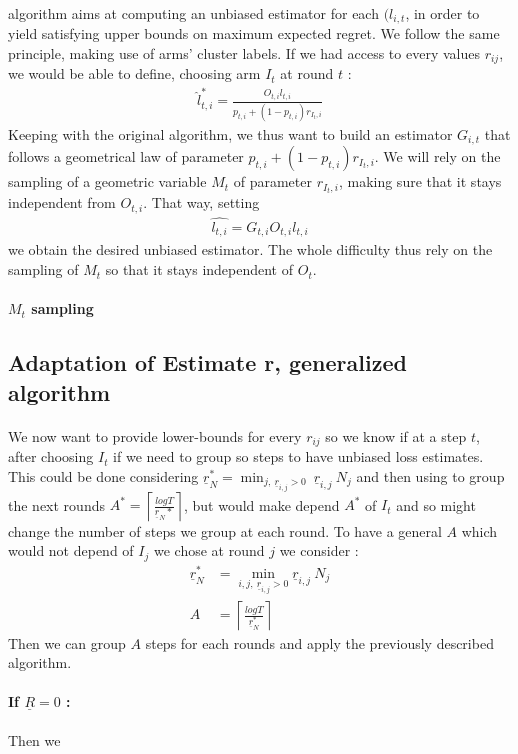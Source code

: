 \documentclass[11pt,a4paper]{article}
\begin{document}
\paragraph{}\cite{valko} algorithm aims at computing an unbiased estimator for each $(l_{i,t}$, in order to yield satisfying upper bounds on maximum expected regret. We follow the same principle, making use of arms' cluster labels. If we had access to every values $r_{ij}$, we would be able to define, choosing arm $I_t$ at round $t$ : 
\begin{align*}
\hat l_{t,i}^{*} = \frac{O_{t,i}l_{t,i}}{p_{t,i}+(1-p_{t,i})r_{I_t,i}}
\end{align*}
Keeping with the original algorithm, we thus want to build an estimator $G_{i,t}$ that follows a geometrical law of parameter $p_{t,i}+(1-p_{t,i})r_{I_t,i}$. We will rely on the sampling of a geometric variable $M_t$ of parameter $r_{I_t,i}$, making sure that it stays independent from $O_{t,i}$. That way, setting
\begin{align*}
\hat{l_{t,i}}=G_{t,i}O_{t,i}l_{t,i}
\end{align*}
we obtain the desired unbiased estimator. The whole difficulty thus rely on the sampling of $M_t$ so that it stays independent of $O_t$.

\paragraph{$M_t$ sampling}


\subsection{Adaptation of Estimate r, generalized algorithm}
\paragraph{}We now want to provide lower-bounds for every $r_{ij}$ so we know if at a step $t$, after choosing $I_t$ if we need to group so steps to have unbiased loss estimates. This could be done considering $\underline{r}_N^{*}=\min_{j,\ \underline{r}_{i,j}>0}\ \underline{r}_{i,j}\:N_j$ and then using to group the next rounds $A^{*} =\left\lceil \frac{log T}{\underline{r}_N^{}*} \right\rceil$, but would make depend $A^{*}$ of $I_t$ and so might change the number of steps we group at each round. To have a general $A$ which would not depend of $I_j$ we chose at round $j$ we consider :
\begin{align*}
\underline{r}_N^* &= \min_{i,j,\ \underline{r}_{i,j}>0} \underline{r}_{i,j}\:N_j\\
A &= \left\lceil \frac{log T}{\underline{r}_N^{*}} \right\rceil
\end{align*}
Then we can group $A$ steps for each rounds and apply the previously described algorithm.

\paragraph{If $\underline{R}=0$ : \\}
Then we 
\end{document}
